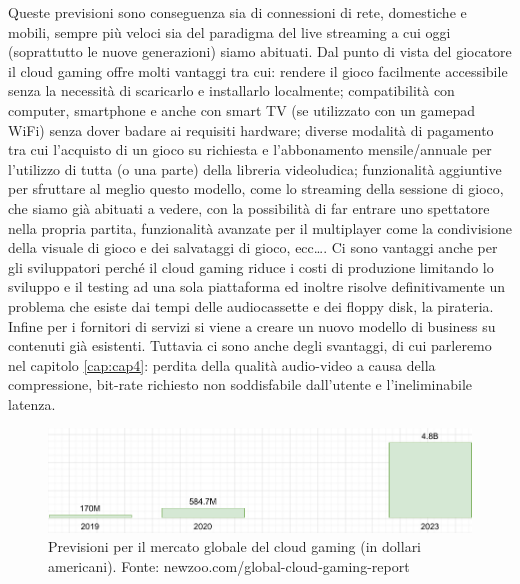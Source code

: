 Queste previsioni sono conseguenza sia di connessioni di rete, domestiche e mobili, sempre più veloci sia del paradigma del live streaming a cui oggi (soprattutto le nuove generazioni) siamo abituati. Dal punto di vista del giocatore il cloud gaming offre molti vantaggi tra cui: rendere il gioco facilmente accessibile senza la necessità di scaricarlo e installarlo localmente; compatibilità con computer, smartphone e anche con smart TV (se utilizzato con un gamepad WiFi) senza dover badare ai requisiti hardware; diverse modalità di pagamento tra cui l'acquisto di un gioco su richiesta e l'abbonamento mensile/annuale per l'utilizzo di tutta (o una parte) della libreria videoludica; funzionalità aggiuntive per sfruttare al meglio questo modello, come lo streaming della sessione di gioco, che siamo già abituati a vedere, con la possibilità di far entrare uno spettatore nella propria partita, funzionalità avanzate per il multiplayer come la condivisione della visuale di gioco e dei salvataggi di gioco, ecc\dots. Ci sono vantaggi anche per gli sviluppatori perché il cloud gaming riduce i costi di produzione limitando lo sviluppo e il testing ad una sola piattaforma ed inoltre risolve definitivamente un problema che esiste dai tempi delle audiocassette e dei floppy disk, la pirateria. Infine per i fornitori di servizi si viene a creare un nuovo modello di business su contenuti già esistenti. Tuttavia ci sono anche degli svantaggi, di cui parleremo nel capitolo \ref{cap:cap4}: perdita della qualità audio-video a causa della compressione, bit-rate richiesto non soddisfabile dall'utente e l'ineliminabile latenza.

\begin{figure}[H]
	\includegraphics[width=\linewidth]{immagini/Newzoo_Cloud_Gaming_Revenues}
	\caption{Previsioni per il mercato globale del cloud gaming (in dollari americani). Fonte: newzoo.com/global-cloud-gaming-report}
	\label{fig:Newzoo_Cloud_Gaming_Revenues}
\end{figure}